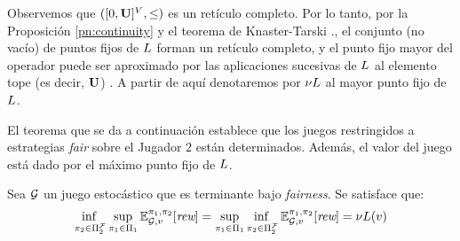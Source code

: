 Observemos que $([0,\mathbf{U}]^V, \leq)$ es un retículo completo. Por lo tanto, por la Proposición \ref{pn:continuity} y el teorema de Knaster-Tarski \cite{davey1990introduction}., el conjunto (no vacío) de puntos fijos de $L$ forman un retículo completo, y el punto fijo mayor del operador puede ser aproximado por las aplicaciones sucesivas de $L$ al elemento tope (es decir, $\mathbf{U}$) \cite{davey1990introduction}. A partir de aquí denotaremos por $\nu L$ al mayor punto fijo de $L$.

El teorema que se da a continuación establece que los juegos restringidos a estrategias \textit{fair} sobre el Jugador $2$ están determinados.
Además, el valor del juego está dado por el máximo punto fijo de $L$.
\begin{theorem}\label{thm:game-determinacy} Sea $\mathcal{G}$ un juego estocástico que es terminante bajo \textit{fairness}. Se satisface que:
\[\adjustlimits
	\inf_{\strat{2} \in \FairStrats{2}} \sup_{\strat{1} \in \Strategies{1}} \Expect{\strat{1}}{\strat{2}}_{\StochG,v}[\Rewards] = \adjustlimits \sup_{\strat{1} \in \Strategies{1}}   \inf_{\strat{2} \in \FairStrats{2}}  \Expect{\strat{1}}{\strat{2}}_{\StochG,v}[\Rewards] = \nu \Bellman(v)
\]
\end{theorem}
%
